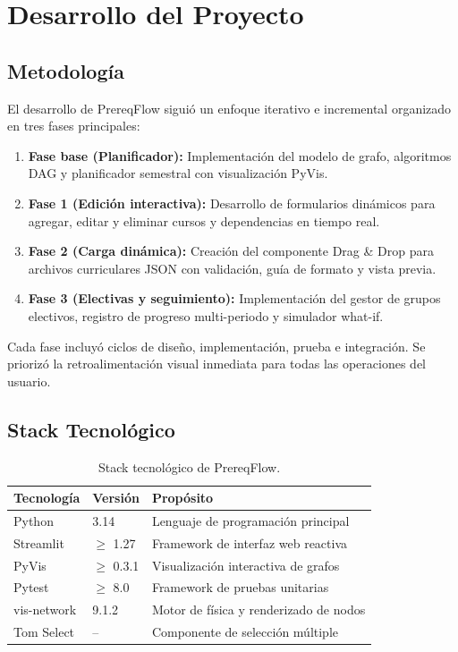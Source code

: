 \documentclass[12pt]{report}
\begin{document}
\chapter{Desarrollo del Proyecto}

\section{Metodología}

El desarrollo de PrereqFlow siguió un enfoque iterativo e incremental organizado en tres fases principales:

\begin{enumerate}
    \item \textbf{Fase base (Planificador):} Implementación del modelo de grafo, algoritmos DAG y planificador semestral con visualización PyVis.
    \item \textbf{Fase 1 (Edición interactiva):} Desarrollo de formularios dinámicos para agregar, editar y eliminar cursos y dependencias en tiempo real.
    \item \textbf{Fase 2 (Carga dinámica):} Creación del componente Drag \& Drop para archivos curriculares JSON con validación, guía de formato y vista previa.
    \item \textbf{Fase 3 (Electivas y seguimiento):} Implementación del gestor de grupos electivos, registro de progreso multi-periodo y simulador what-if.
\end{enumerate}

Cada fase incluyó ciclos de diseño, implementación, prueba e integración. Se priorizó la retroalimentación visual inmediata para todas las operaciones del usuario.

\section{Stack Tecnológico}

\begin{table}[H]
    \centering
    \begin{tabular}{lll}
        \toprule
        \textbf{Tecnología} & \textbf{Versión} & \textbf{Propósito} \\
        \midrule
        Python & 3.14 & Lenguaje de programación principal \\
        Streamlit & $\ge$ 1.27 & Framework de interfaz web reactiva \\
        PyVis & $\ge$ 0.3.1 & Visualización interactiva de grafos \\
        Pytest & $\ge$ 8.0 & Framework de pruebas unitarias \\
        vis-network & 9.1.2 & Motor de física y renderizado de nodos \\
        Tom Select & -- & Componente de selección múltiple \\
        \bottomrule
    \end{tabular}
    \caption{Stack tecnológico de PrereqFlow.}
    \label{tab:stack}
\end{table}
\end{document}
